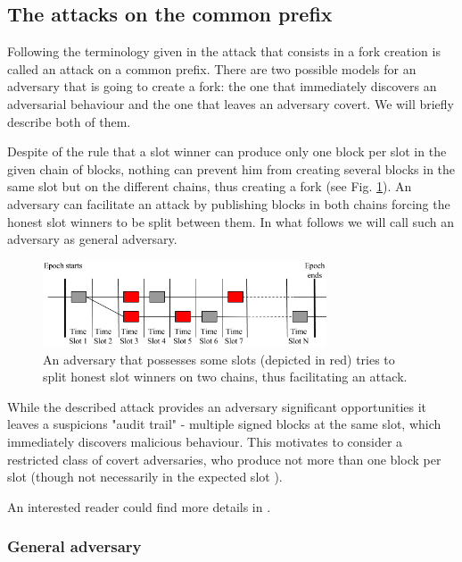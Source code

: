 \documentclass[10pt,a4paper]{article}
\numberwithin{equation}{section} %
\theoremstyle{plain}
\theoremstyle{definition}
\theoremstyle{remark}
\begin{document}
    \subsection{The attacks on the common prefix}
    
    Following the terminology given in \cite{KRDO16} the attack that consists in a fork creation is called an attack on a common prefix. There are two possible models for an adversary that is going to create a fork: the one that immediately discovers an adversarial behaviour and the one that leaves an adversary covert. We will briefly describe both of them.
    
    Despite of the rule that a slot winner can produce only one block per slot in the given chain of blocks, nothing can prevent him from creating several blocks in the same slot but on the different chains, thus creating a fork (see Fig. \ref{fig:ouroboros_split_attack}). An adversary can facilitate an attack by publishing blocks in both chains forcing the honest slot winners to be split between them. In what follows we will call such an adversary as general adversary.
    \begin{figure}[h] 
        \centering
        \includegraphics[width=0.75\textwidth]{ouroboros_split_attack}
        \caption{An adversary that possesses some slots (depicted in red) tries to split honest slot winners on two chains, thus facilitating an attack.}
        \label{fig:ouroboros_split_attack}
    \end{figure}
    
    While the described attack provides an adversary significant opportunities it leaves a suspicions "audit trail" - multiple signed blocks at the same slot, which immediately discovers malicious behaviour. This motivates to consider a restricted class of covert adversaries, who produce not more than one block per slot (though not necessarily in the expected slot \cite{KRDO16}).
    
    An interested reader could find more details in \cite{KRDO16, RMKQ17}.
    
    \subsubsection{General adversary} \label{sec:general_adv}
    
\end{document}

